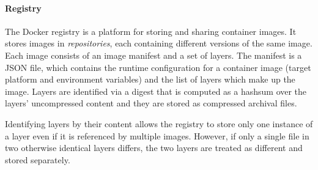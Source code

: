 

\paragraph{Registry}
%
The Docker registry is a platform for storing and sharing container images.
%
It stores images in \emph{repositories}, each containing different versions of
the same image. 
%
Each image consists of an image manifest and a set of layers.
%
The manifest is a JSON file, which contains the runtime configuration for a
container image (\eg target platform and environment variables) and the list
of layers which make up the image.
%
Layers are identified via a digest that is computed as a hashsum over the
layers' uncompressed content and they are stored as compressed archival files.
%
%
%
%
%
%

%
Identifying layers by their content allows the registry to store only one instance
of a layer even if it is referenced by multiple images.
%
%
However, if only a single file in two otherwise identical layers
differs, the two layers are treated as different and stored separately.
